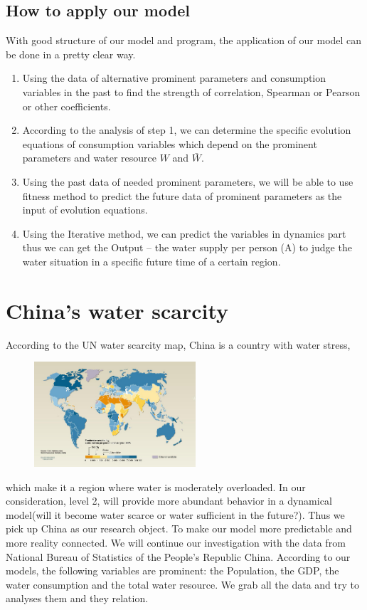   \subsection{How to apply our model}

    With good structure of our model and program, the application of our model can be done in a pretty clear way.

    \begin{enumerate}[step 1]
      \item Using the data of alternative prominent parameters and consumption variables in the past to find the strength of correlation, Spearman or Pearson or other coefficients.
      \item According to the analysis of step 1, we can  determine the specific evolution equations of consumption variables which depend on the prominent parameters and water resource $W$ and $\bar{W}$.
      \item Using the past data of needed prominent parameters, we will be able to use fitness method to predict the future data of prominent parameters as the input of evolution equations.
      \item Using the Iterative method, we can predict the variables in dynamics part thus we can get the Output -- the water supply per person (A) to judge the water situation in a specific future time of a certain region.
    \end{enumerate}

\section{China's water scarcity}
  According to the UN water scarcity map\cite{WaterScarcityMap}, China is a country with water stress,
  \begin{figure}
  \includegraphics[width = 6cm]{picture/WaterScarcityMap.jpg}
  \end{figure}
  which make it a region where water is moderately overloaded. In our consideration, level 2, will provide more abundant behavior in a dynamical model(will it become water scarce or water sufficient in the future?). Thus we pick up China as our research object. To make our model more predictable and more reality connected. We will continue our investigation with the data from National Bureau of Statistics of the People's Republic China\cite{ChinaDataBase}.
  According to our models, the following variables are prominent: the Population, the GDP, the water consumption and the total water resource.
  We grab all the data and try to analyses them and they relation.

